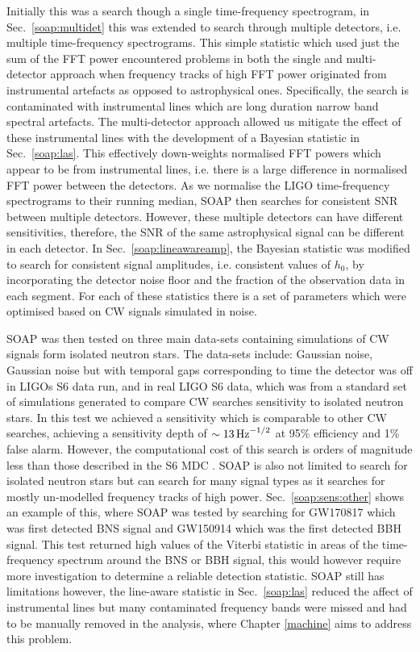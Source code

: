 Initially this was a search though a single time-frequency spectrogram, in Sec.~\ref{soap:multidet} this was extended to search through multiple detectors, i.e. multiple time-frequency spectrograms.
This simple statistic which used just the sum of the \gls{FFT} power encountered problems in both the single and multi-detector approach when frequency tracks of high \gls{FFT} power originated from instrumental artefacts as opposed to astrophysical ones.
Specifically, the search is contaminated with instrumental lines which are long duration narrow band spectral artefacts. 
The multi-detector approach allowed us mitigate the effect of these instrumental lines with the development of a Bayesian statistic in Sec.~\ref{soap:las}.
This effectively down-weights normalised \gls{FFT} powers which appear to be from instrumental lines, i.e. there is a large difference in normalised \gls{FFT} power between the detectors.
As we normalise the \gls{LIGO} time-frequency spectrograms to their running median, SOAP then searches for consistent \gls{SNR} between multiple detectors.
However, these multiple detectors can have different sensitivities, therefore, the \gls{SNR} of the same astrophysical signal can be different in each detector.
In Sec.~\ref{soap:lineawareamp}, the Bayesian statistic was modified to search for consistent signal amplitudes, i.e. consistent values of $h_0$, by incorporating the detector noise floor and the fraction of the observation data in each segment.
For each of these statistics there is a set of parameters which were optimised based on \gls{CW} signals simulated in noise. 

SOAP was then tested on three main data-sets containing simulations of \gls{CW} signals form isolated neutron stars.
The data-sets include: Gaussian noise, Gaussian noise but with temporal gaps corresponding to time the detector was off in \glspl{LIGO} S6 data run, and in real \gls{LIGO} S6 data, which was from a standard set of simulations generated to compare \gls{CW} searches sensitivity to isolated neutron stars.
In this test we achieved a sensitivity which is comparable to other \gls{CW} searches, achieving a sensitivity depth of $\sim 13 \, \rm{Hz}^{-1/2}$ at 95\% efficiency and 1\% false alarm. 
However, the computational cost of this search is orders of magnitude less than those described in the S6 \gls{MDC} \citep{walsh2016ComparisonMethods}. 
SOAP is also not limited to search for isolated neutron stars but can search for many signal types as it searches for mostly un-modelled frequency tracks of high power.
Sec.~\ref{soap:sens:other} shows an example of this, where SOAP was tested by searching for GW170817 which was first detected \gls{BNS} signal and GW150914 which was the first detected \gls{BBH} signal. 
This test returned high values of the Viterbi statistic in areas of the time-frequency spectrum around the \gls{BNS} or \gls{BBH} signal, this would however require more investigation to determine a reliable detection statistic.
SOAP still has limitations however, the line-aware statistic in Sec.~\ref{soap:las} reduced the affect of instrumental lines but many contaminated frequency bands were missed and had to be manually removed in the analysis, where Chapter \ref{machine} aims to address this problem.

